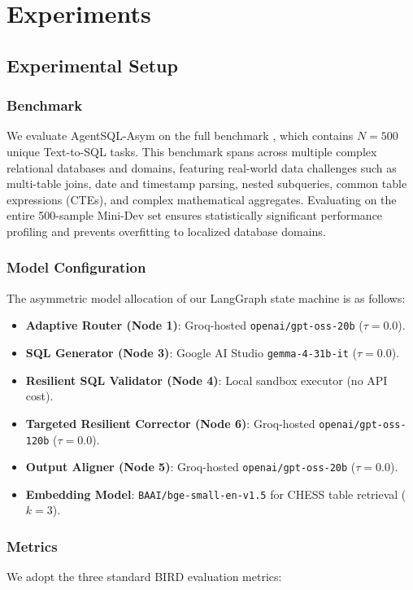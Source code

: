\section{Experiments}
\label{sec:experiments}

\subsection{Experimental Setup}

\subsubsection{Benchmark}
We evaluate AgentSQL-Asym on the full  benchmark \cite{li_can_2023}, which contains $N = 500$ unique Text-to-SQL tasks. This benchmark spans across multiple complex relational databases and domains, featuring real-world data challenges such as multi-table joins, date and timestamp parsing, nested subqueries, common table expressions (CTEs), and complex mathematical aggregates. Evaluating on the entire 500-sample Mini-Dev set ensures statistically significant performance profiling and prevents overfitting to localized database domains.

\subsubsection{Model Configuration}
The asymmetric model allocation of our LangGraph state machine is as follows:
\begin{itemize}
    \raggedright
    \item \textbf{Adaptive Router (Node 1)}: Groq-hosted \texttt{openai/gpt-oss-20b} ($\tau = 0.0$).
    \item \textbf{SQL Generator (Node 3)}: Google AI Studio \texttt{gemma-4-31b-it} ($\tau = 0.0$).
    \item \textbf{Resilient SQL Validator (Node 4)}: Local sandbox executor (no API cost).
    \item \textbf{Targeted Resilient Corrector (Node 6)}: Groq-hosted \texttt{openai/gpt-oss-120b} ($\tau = 0.0$).
    \item \textbf{Output Aligner (Node 5)}: Groq-hosted \texttt{openai/gpt-oss-20b} ($\tau = 0.0$).
    \item \textbf{Embedding Model}: \texttt{BAAI/bge-small-en-v1.5} for CHESS table retrieval ($k = 3$).
\end{itemize}

\subsubsection{Metrics}
We adopt the three standard BIRD evaluation metrics:

